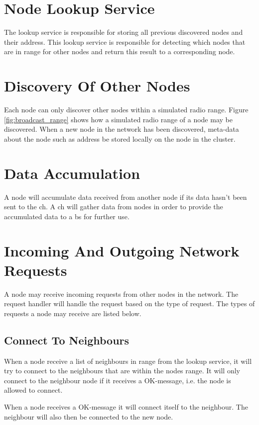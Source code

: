 \documentclass[USenglish]{uit-thesis}
\begin{document}
\section{Node Lookup Service} \label{sec:nodeLS}
The lookup service is responsible for storing all previous discovered nodes and their address. This lookup service is responsible for detecting which nodes that are in range for other nodes and return this result to a corresponding node. 



\section{Discovery Of Other Nodes} \label{sec:discON}
Each node can only discover other nodes within a simulated radio range. Figure \ref{fig:broadcast_range} shows how a simulated radio range of a node may be discovered. When a new node in the network has been discovered, meta-data about the node such as address be stored locally on the node in the cluster.


\section{Data Accumulation}
A node will accumulate data received from another node if its data hasn't been sent to the \gls{ch}. A \gls{ch} will gather data from nodes in order to provide the accumulated data to a \gls{bs} for further use.


\section{Incoming And Outgoing Network Requests}
A node may receive incoming requests from other nodes in the network. The request handler will handle the request based on the type of request. The types of requests a node may receive are listed below.

\subsection{Connect To Neighbours}
When a node receive a list of neighbours in range from the lookup service, it will try to connect to the neighbours that are within the nodes range. It will only connect to the neighbour node if it receives a OK-message, i.e. the node is allowed to connect.

When a node receives a OK-message it will connect itself to the neighbour. The neighbour will also then be connected to the new node.
\end{document}
